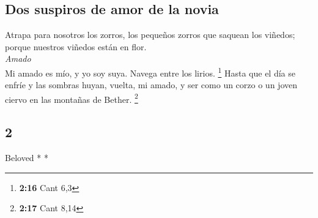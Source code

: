 \begin{paracol}{2}
\hypertarget{dos-suspiros-de-amor-de-la-novia}{%
\subsection{Dos suspiros de amor de la
novia}\label{dos-suspiros-de-amor-de-la-novia}}

 Atrapa para nosotros los zorros, los pequeños zorros que
saquean los viñedos; porque nuestros viñedos están en flor.\\
\emph{Amado}\\
 Mi amado es mío, y yo soy suya. Navega entre los lirios.
\footnote{\textbf{2:16} Cant 6,3}  Hasta que el día se
enfríe y las sombras huyan, vuelta, mi amado, y ser como un corzo o un
joven ciervo en las montañas de Bether. \footnote{\textbf{2:17} Cant
  8,14}

\switchcolumn
\begin{otherlanguage}{english}

\hypertarget{section-3}{%
\section{2}\label{section-3}}

\emph{\hfill\break
}Beloved * *\\


\end{otherlanguage}
\end{paracol}
